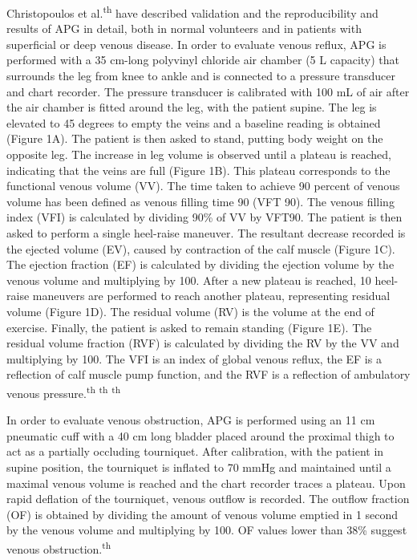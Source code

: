 \documentclass[numberinsection,times,10pt,spreadimages]{memoir}
\begin{document}
\begin{multicols}{2}
Christopoulos et al.\textsuperscript{th}
have
described validation and the reproducibility and results of APG in detail, both
in
normal volunteers and in patients with superficial or deep venous disease. In
order
to evaluate venous reflux, APG is performed with a 35 cm-long polyvinyl chloride
air
chamber (5 L capacity) that surrounds the leg from knee to ankle and is
connected to
a pressure transducer and chart recorder. The pressure transducer is calibrated
with
100 mL of air after the air chamber is fitted around the leg, with the patient
supine. The leg is elevated to 45 degrees to empty the veins and a baseline
reading
is obtained (Figure 1A). The patient is then
asked to stand, putting body weight on the opposite leg. The increase in leg
volume
is observed until a plateau is reached, indicating that the veins are full
(Figure 1B). This plateau corresponds to the
functional venous volume (VV). The time taken to achieve 90 percent of venous
volume
has been defined as venous filling time 90 (VFT 90). The venous filling index
(VFI)
is calculated by dividing 90\% of VV by VFT90. The patient is then asked to
perform a
single heel-raise maneuver. The resultant decrease recorded is the ejected
volume
(EV), caused by contraction of the calf muscle (Figure 1C). The ejection
fraction (EF) is calculated by dividing the
ejection volume by the venous volume and multiplying by 100. After a new plateau
is
reached, 10 heel-raise maneuvers are performed to reach another plateau,
representing residual volume (Figure 1D). The
residual volume (RV) is the volume at the end of exercise. Finally, the patient
is
asked to remain standing (Figure 1E). The
residual volume fraction (RVF) is calculated by dividing the RV by the VV and
multiplying by 100. The VFI is an index of global venous reflux, the EF is a
reflection of calf muscle pump function, and the RVF is a reflection of
ambulatory
venous pressure.\textsuperscript{th}
\textsuperscript{th}
\textsuperscript{th}

In order to evaluate venous obstruction, APG is performed using an 11 cm
pneumatic
cuff with a 40 cm long bladder placed around the proximal thigh to act as a
partially occluding tourniquet. After calibration, with the patient in supine
position, the tourniquet is inflated to 70 mmHg and maintained until a maximal
venous volume is reached and the chart recorder traces a plateau. Upon rapid
deflation of the tourniquet, venous outflow is recorded. The outflow fraction
(OF)
is obtained by dividing the amount of venous volume emptied in 1 second by the
venous volume and multiplying by 100. OF values lower than 38\% suggest venous
obstruction.\textsuperscript{th}


\end{multicols}
\end{document}
